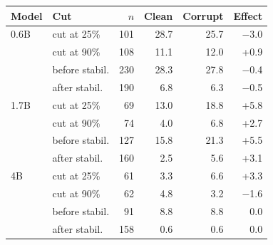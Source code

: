 \begin{tabular}{llrrrr}
\toprule
Model & Cut & $n$ & Clean & Corrupt & Effect \\
\midrule
0.6B & cut at 25\% & 101 & 28.7 & 25.7 & $-$3.0 \\
 & cut at 90\% & 108 & 11.1 & 12.0 & +0.9 \\
 & before stabil. & 230 & 28.3 & 27.8 & $-$0.4 \\
 & after stabil. & 190 & 6.8 & 6.3 & $-$0.5 \\
\midrule
1.7B & cut at 25\% & 69 & 13.0 & 18.8 & +5.8 \\
 & cut at 90\% & 74 & 4.0 & 6.8 & +2.7 \\
 & before stabil. & 127 & 15.8 & 21.3 & +5.5 \\
 & after stabil. & 160 & 2.5 & 5.6 & +3.1 \\
\midrule
4B & cut at 25\% & 61 & 3.3 & 6.6 & +3.3 \\
 & cut at 90\% & 62 & 4.8 & 3.2 & $-$1.6 \\
 & before stabil. & 91 & 8.8 & 8.8 & 0.0 \\
 & after stabil. & 158 & 0.6 & 0.6 & 0.0 \\
\bottomrule
\end{tabular}
